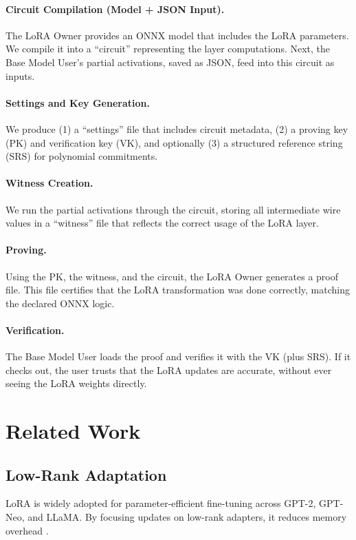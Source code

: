 \documentclass[11pt]{article}
\begin{document}
\paragraph{Circuit Compilation (Model + JSON Input).}
The LoRA Owner provides an ONNX model that includes the LoRA parameters. We compile it into a “circuit” representing the layer computations. Next, the Base Model User's partial activations, saved as JSON, feed into this circuit as inputs.

\paragraph{Settings and Key Generation.}
We produce (1) a “settings” file that includes circuit metadata, (2) a proving key (PK) and verification key (VK), and optionally (3) a structured reference string (SRS) for polynomial commitments.

\paragraph{Witness Creation.}
We run the partial activations through the circuit, storing all intermediate wire values in a “witness” file that reflects the correct usage of the LoRA layer.

\paragraph{Proving.}
Using the PK, the witness, and the circuit, the LoRA Owner generates a proof file. This file certifies that the LoRA transformation was done correctly, matching the declared ONNX logic.

\paragraph{Verification.}
The Base Model User loads the proof and verifies it with the VK (plus SRS). If it checks out, the user trusts that the LoRA updates are accurate, without ever seeing the LoRA weights directly.

\section{Related Work}

\subsection{Low-Rank Adaptation}
LoRA \cite{hu2021lora} is widely adopted for parameter-efficient fine-tuning across GPT-2, GPT-Neo, and LLaMA. By focusing updates on low-rank adapters, it reduces memory overhead \cite{ding2022delta}.
\end{document}
